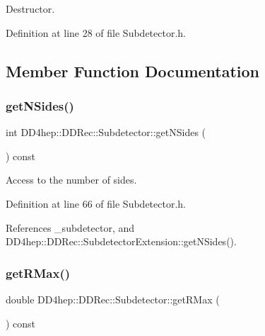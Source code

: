 Destructor. 



Definition at line 28 of file Subdetector.\+h.



\subsection{Member Function Documentation}
\hypertarget{class_d_d4hep_1_1_d_d_rec_1_1_subdetector_a10f33f7031e8876e46afc3933c32f545}{}\label{class_d_d4hep_1_1_d_d_rec_1_1_subdetector_a10f33f7031e8876e46afc3933c32f545} 
\subsubsection{\texorpdfstring{get\+N\+Sides()}{getNSides()}}
{\footnotesize\ttfamily int D\+D4hep\+::\+D\+D\+Rec\+::\+Subdetector\+::get\+N\+Sides (\begin{DoxyParamCaption}{ }\end{DoxyParamCaption}) const\hspace{0.3cm}{\ttfamily [inline]}}



Access to the number of sides. 



Definition at line 66 of file Subdetector.\+h.



References \+\_\+subdetector, and D\+D4hep\+::\+D\+D\+Rec\+::\+Subdetector\+Extension\+::get\+N\+Sides().

\hypertarget{class_d_d4hep_1_1_d_d_rec_1_1_subdetector_a3b735c48952a9a3a93abf0e38f3fd2d2}{}\label{class_d_d4hep_1_1_d_d_rec_1_1_subdetector_a3b735c48952a9a3a93abf0e38f3fd2d2} 
\subsubsection{\texorpdfstring{get\+R\+Max()}{getRMax()}}
{\footnotesize\ttfamily double D\+D4hep\+::\+D\+D\+Rec\+::\+Subdetector\+::get\+R\+Max (\begin{DoxyParamCaption}{ }\end{DoxyParamCaption}) const\hspace{0.3cm}{\ttfamily [inline]}}



